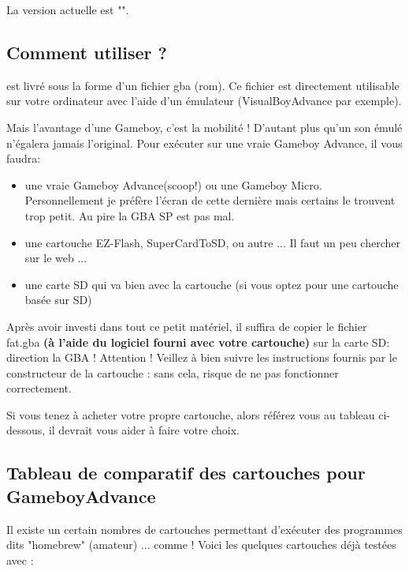 \documentclass[12pt,a4paper]{article}
\begin{document}
    La version actuelle est "\fatversion".
    
    \subsection{Comment utiliser \FAT ?}

    \FAT est livré sous la forme d'un fichier gba (rom).
    Ce fichier est directement utilisable sur votre ordinateur avec l'aide d'un émulateur (VisualBoyAdvance par exemple).
    \medskip
    
    Mais l'avantage d'une Gameboy, c'est la mobilité !
    D'autant plus qu'un son émulé n'égalera jamais l'original.
    Pour exécuter \FAT sur une vraie Gameboy Advance, il vous faudra:
    \begin{itemize}
        \item{une vraie Gameboy Advance(scoop!) ou une Gameboy Micro. Personnellement je préfère l'écran de cette dernière mais certains le trouvent trop petit. Au pire la GBA SP est pas mal.}
        \item{une cartouche EZ-Flash, SuperCardToSD, ou autre ... Il faut un peu chercher sur le web ...}
        \item{une carte SD qui va bien avec la cartouche (si vous optez pour une cartouche basée sur SD)} 
    \end{itemize}\medskip
    
    Après avoir investi dans tout ce petit matériel, il suffira de copier le fichier fat.gba {\bf (à l'aide du logiciel fourni avec votre cartouche)} sur la carte SD: direction la GBA !
    Attention ! Veillez à bien suivre les instructions fournis par le constructeur de la cartouche : sans cela, \FAT risque de ne pas fonctionner correctement.
    
    
    Si vous tenez à acheter votre propre cartouche, alors référez vous au tableau ci-dessous, il devrait vous aider à faire votre choix.
    
    \subsection{Tableau de comparatif des cartouches pour GameboyAdvance}
    
    Il existe un certain nombres de cartouches permettant d'exécuter des programmes dits "homebrew" (amateur) ... comme \FAT !
    Voici les quelques cartouches déjà testées avec \FAT :
    \medskip
\end{document}
